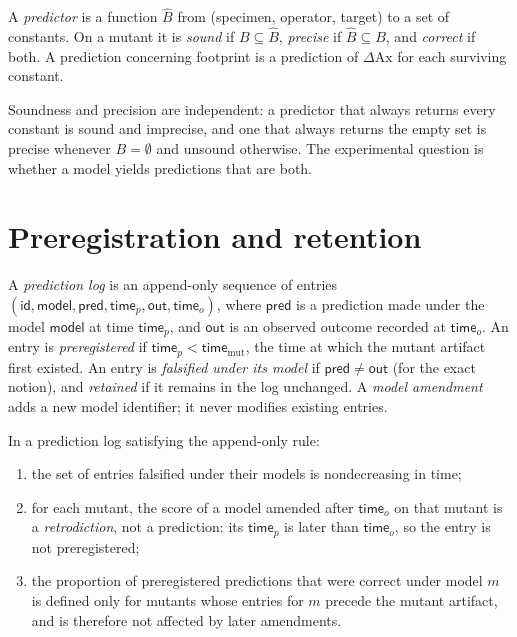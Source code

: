 \begin{definition}
\label{def:prediction}
A \emph{predictor} is a function $\widehat B$ from (specimen, operator, target) to a set of constants. On a mutant it is \emph{sound} if $B\subseteq\widehat B$, \emph{precise} if $\widehat B\subseteq B$, and \emph{correct} if both. A prediction concerning footprint is a prediction of $\Delta\mathrm{Ax}$ for each surviving constant.
\end{definition}

Soundness and precision are independent: a predictor that always returns every constant is sound and imprecise, and one that always returns the empty set is precise whenever $B=\emptyset$ and unsound otherwise. The experimental question is whether a model yields predictions that are both.

\section{Preregistration and retention}

\begin{definition}
\label{def:log}
A \emph{prediction log} is an append-only sequence of entries $(\mathsf{id},\mathsf{model},\mathsf{pred},\mathsf{time}_p,\mathsf{out},\mathsf{time}_o)$, where $\mathsf{pred}$ is a prediction made under the model $\mathsf{model}$ at time $\mathsf{time}_p$, and $\mathsf{out}$ is an observed outcome recorded at $\mathsf{time}_o$. An entry is \emph{preregistered} if $\mathsf{time}_p<\mathsf{time}_{\mathrm{mut}}$, the time at which the mutant artifact first existed. An entry is \emph{falsified under its model} if $\mathsf{pred}\ne\mathsf{out}$ (for the exact notion), and \emph{retained} if it remains in the log unchanged. A \emph{model amendment} adds a new model identifier; it never modifies existing entries.
\end{definition}

\begin{proposition}
\label{prop:retention}
In a prediction log satisfying the append-only rule:
\begin{enumerate}[label=(\alph*),nosep]
\item the set of entries falsified under their models is nondecreasing in time;
\item for each mutant, the score of a model amended after $\mathsf{time}_o$ on that mutant is a \emph{retrodiction}, not a prediction: its $\mathsf{time}_p$ is later than $\mathsf{time}_o$, so the entry is not preregistered;
\item the proportion of preregistered predictions that were correct under model $m$ is defined only for mutants whose entries for $m$ precede the mutant artifact, and is therefore not affected by later amendments.
\end{enumerate}
\end{proposition}

